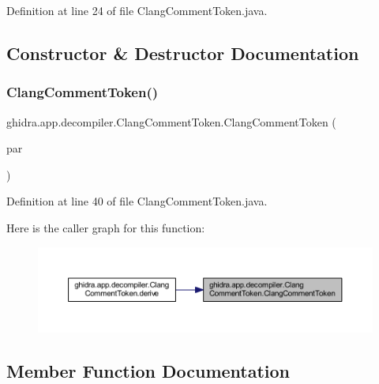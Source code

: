 Definition at line 24 of file Clang\+Comment\+Token.\+java.



\subsection{Constructor \& Destructor Documentation}
\mbox{\label{classghidra_1_1app_1_1decompiler_1_1_clang_comment_token_a1cb6ab510d9ce9249f82ac0c9279a7d6}} 
\subsubsection{\texorpdfstring{ClangCommentToken()}{ClangCommentToken()}}
{\footnotesize\ttfamily ghidra.\+app.\+decompiler.\+Clang\+Comment\+Token.\+Clang\+Comment\+Token (\begin{DoxyParamCaption}\item[{\mbox{\hyperlink{interfaceghidra_1_1app_1_1decompiler_1_1_clang_node}{Clang\+Node}}}]{par }\end{DoxyParamCaption})\hspace{0.3cm}{\ttfamily [inline]}}



Definition at line 40 of file Clang\+Comment\+Token.\+java.

Here is the caller graph for this function\+:
\nopagebreak
\begin{figure}[H]
\begin{center}
\leavevmode
\includegraphics[width=350pt]{classghidra_1_1app_1_1decompiler_1_1_clang_comment_token_a1cb6ab510d9ce9249f82ac0c9279a7d6_icgraph}
\end{center}
\end{figure}


\subsection{Member Function Documentation}
\mbox{\label{classghidra_1_1app_1_1decompiler_1_1_clang_comment_token_a8edaa235b8dac1e254bb1aa4bc0ef55c}} 

